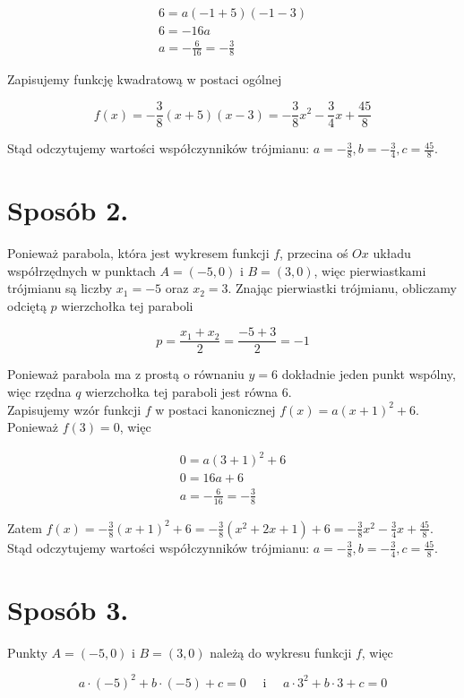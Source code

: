 \documentclass[10pt]{article}
\begin{document}
$$
\begin{gathered}
6=a(-1+5)(-1-3) \\
6=-16 a \\
a=-\frac{6}{16}=-\frac{3}{8}
\end{gathered}
$$

Zapisujemy funkcję kwadratową w postaci ogólnej

$$
f(x)=-\frac{3}{8}(x+5)(x-3)=-\frac{3}{8} x^{2}-\frac{3}{4} x+\frac{45}{8}
$$

Stąd odczytujemy wartości współczynników trójmianu: $a=-\frac{3}{8}, b=-\frac{3}{4}, c=\frac{45}{8}$.

\section*{Sposób 2.}
Ponieważ parabola, która jest wykresem funkcji $f$, przecina oś $O x$ układu współrzędnych w punktach $A=(-5,0)$ i $B=(3,0)$, więc pierwiastkami trójmianu są liczby $x_{1}=-5$ oraz $x_{2}=3$. Znając pierwiastki trójmianu, obliczamy odciętą $p$ wierzchołka tej paraboli

$$
p=\frac{x_{1}+x_{2}}{2}=\frac{-5+3}{2}=-1
$$

Ponieważ parabola ma z prostą o równaniu $y=6$ dokładnie jeden punkt wspólny, więc rzędna $q$ wierzchołka tej paraboli jest równa 6.\\
Zapisujemy wzór funkcji $f$ w postaci kanonicznej $f(x)=a(x+1)^{2}+6$.\\
Ponieważ $f(3)=0$, więc

$$
\begin{gathered}
0=a(3+1)^{2}+6 \\
0=16 a+6 \\
a=-\frac{6}{16}=-\frac{3}{8}
\end{gathered}
$$

Zatem $f(x)=-\frac{3}{8}(x+1)^{2}+6=-\frac{3}{8}\left(x^{2}+2 x+1\right)+6=-\frac{3}{8} x^{2}-\frac{3}{4} x+\frac{45}{8}$.\\
Stąd odczytujemy wartości współczynników trójmianu: $a=-\frac{3}{8}, b=-\frac{3}{4}, c=\frac{45}{8}$.

\section*{Sposób 3.}
Punkty $A=(-5,0)$ i $B=(3,0)$ należą do wykresu funkcji $f$, więc

$$
a \cdot(-5)^{2}+b \cdot(-5)+c=0 \quad \text { i } \quad a \cdot 3^{2}+b \cdot 3+c=0
$$
\end{document}
